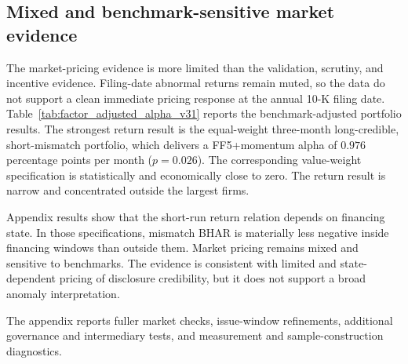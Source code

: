 

\FloatBarrier

\subsection{Mixed and benchmark-sensitive market evidence}

The market-pricing evidence is more limited than the validation, scrutiny, and incentive evidence. Filing-date abnormal returns remain muted, so the data do not support a clean immediate pricing response at the annual 10-K filing date. Table~\ref{tab:factor_adjusted_alpha_v31} reports the benchmark-adjusted portfolio results. The strongest return result is the equal-weight three-month long-credible, short-mismatch portfolio, which delivers a FF5+momentum alpha of $0.976$ percentage points per month ($p=0.026$). The corresponding value-weight specification is statistically and economically close to zero. The return result is narrow and concentrated outside the largest firms.

Appendix results show that the short-run return relation depends on financing state. In those specifications, mismatch BHAR is materially less negative inside financing windows than outside them. Market pricing remains mixed and sensitive to benchmarks. The evidence is consistent with limited and state-dependent pricing of disclosure credibility, but it does not support a broad anomaly interpretation.



\FloatBarrier

The appendix reports fuller market checks, issue-window refinements, additional governance and intermediary tests, and measurement and sample-construction diagnostics.
